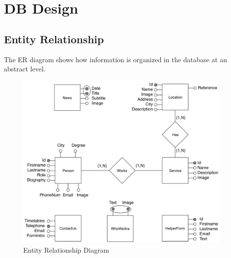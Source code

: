 %
%
\chapter{DB Design}
%
%
\section{Entity Relationship}
\par The ER diagram shows how information is organized in the database at an abstract level.
\begin{figure}[h]
\includegraphics[width=0.95\textwidth, center]{MainMatter/images/ER.jpg}
\caption{Entity Relationship Diagram}
\label{fig:figure2}
\end{figure}
\newpage
%
